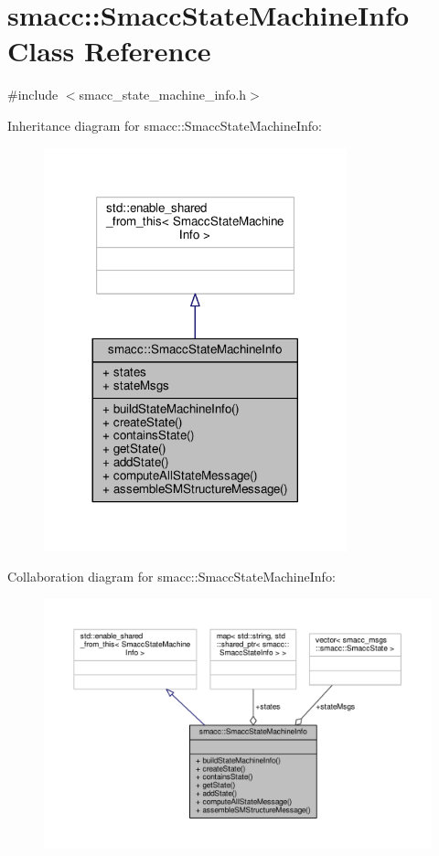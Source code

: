 \hypertarget{classsmacc_1_1SmaccStateMachineInfo}{}\section{smacc\+:\+:Smacc\+State\+Machine\+Info Class Reference}
\label{classsmacc_1_1SmaccStateMachineInfo}


{\ttfamily \#include $<$smacc\+\_\+state\+\_\+machine\+\_\+info.\+h$>$}



Inheritance diagram for smacc\+:\+:Smacc\+State\+Machine\+Info\+:
\nopagebreak
\begin{figure}[H]
\begin{center}
\leavevmode
\includegraphics[width=248pt]{classsmacc_1_1SmaccStateMachineInfo__inherit__graph}
\end{center}
\end{figure}


Collaboration diagram for smacc\+:\+:Smacc\+State\+Machine\+Info\+:
\nopagebreak
\begin{figure}[H]
\begin{center}
\leavevmode
\includegraphics[width=350pt]{classsmacc_1_1SmaccStateMachineInfo__coll__graph}
\end{center}
\end{figure}
